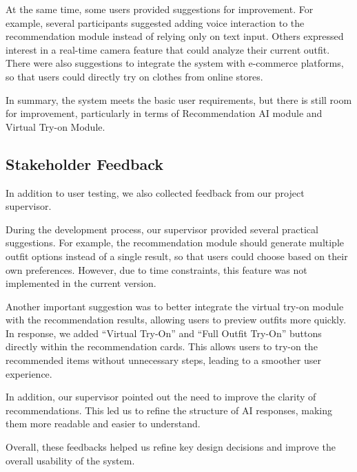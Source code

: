 At the same time, some users provided suggestions for improvement. For example, several participants suggested adding voice interaction to the recommendation module instead of relying only on text input. Others expressed interest in a real-time camera feature that could analyze their current outfit. There were also suggestions to integrate the system with e-commerce platforms, so that users could directly try on clothes from online stores.

In summary, the system meets the basic user requirements, but there is still room for improvement, particularly in terms of Recommendation AI module and Virtual Try-on Module.

\subsection{Stakeholder Feedback}
In addition to user testing, we also collected feedback from our project supervisor.

During the development process, our supervisor provided several practical suggestions. For example, the recommendation module should generate multiple outfit options instead of a single result, so that users could choose based on their own preferences. However, due to time constraints, this feature was not implemented in the current version.

Another important suggestion was to better integrate the virtual try-on module with the recommendation results, allowing users to preview outfits more quickly. In response, we added “Virtual Try-On” and “Full Outfit Try-On” buttons directly within the recommendation cards. This allows users to try-on the recommended items without unnecessary steps, leading to a smoother user experience.

In addition, our supervisor pointed out the need to improve the clarity of recommendations. This led us to refine the structure of AI responses, making them more readable and easier to understand.

Overall, these feedbacks helped us refine key design decisions and improve the overall usability of the system.